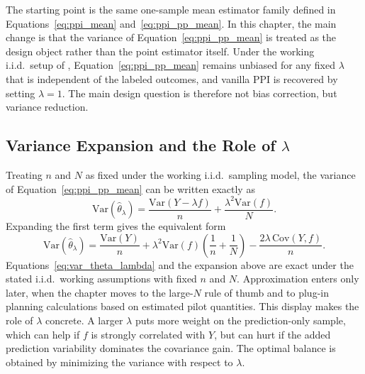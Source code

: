 The starting point is the same one-sample mean estimator family defined in Equations~\eqref{eq:ppi_mean} and~\eqref{eq:ppi_pp_mean}. In this chapter, the main change is that the variance of Equation~\eqref{eq:ppi_pp_mean} is treated as the design object rather than the point estimator itself. Under the working i.i.d.\ setup of \textcite{ppi_power}, Equation~\eqref{eq:ppi_pp_mean} remains unbiased for any fixed $\lambda$ that is independent of the labeled outcomes, and vanilla PPI is recovered by setting $\lambda=1$. The main design question is therefore not bias correction, but variance reduction.

\subsection{Variance Expansion and the Role of \texorpdfstring{$\lambda$}{lambda}}

Treating \(n\) and \(N\) as fixed under the working i.i.d.\ sampling model, the variance of Equation~\eqref{eq:ppi_pp_mean} can be written exactly as
\begin{equation}
\mathrm{Var}(\widehat{\theta}_{\lambda}) =
\frac{\mathrm{Var}(Y - \lambda f)}{n}
+
\frac{\lambda^2 \mathrm{Var}(f)}{N}.
\label{eq:var_theta_lambda}
\end{equation}
Expanding the first term gives the equivalent form
\[
\mathrm{Var}(\widehat{\theta}_{\lambda})
=
\frac{\mathrm{Var}(Y)}{n}
+
\lambda^2 \mathrm{Var}(f)\left(\frac{1}{n}+\frac{1}{N}\right)
-
\frac{2\lambda\,\mathrm{Cov}(Y,f)}{n}.
\]
Equations~\eqref{eq:var_theta_lambda} and the expansion above are exact under the stated i.i.d.\ working assumptions with fixed \(n\) and \(N\). Approximation enters only later, when the chapter moves to the large-\(N\) rule of thumb and to plug-in planning calculations based on estimated pilot quantities. This display makes the role of $\lambda$ concrete. A larger $\lambda$ puts more weight on the prediction-only sample, which can help if $f$ is strongly correlated with $Y$, but can hurt if the added prediction variability dominates the covariance gain. The optimal balance is obtained by minimizing the variance with respect to $\lambda$.

